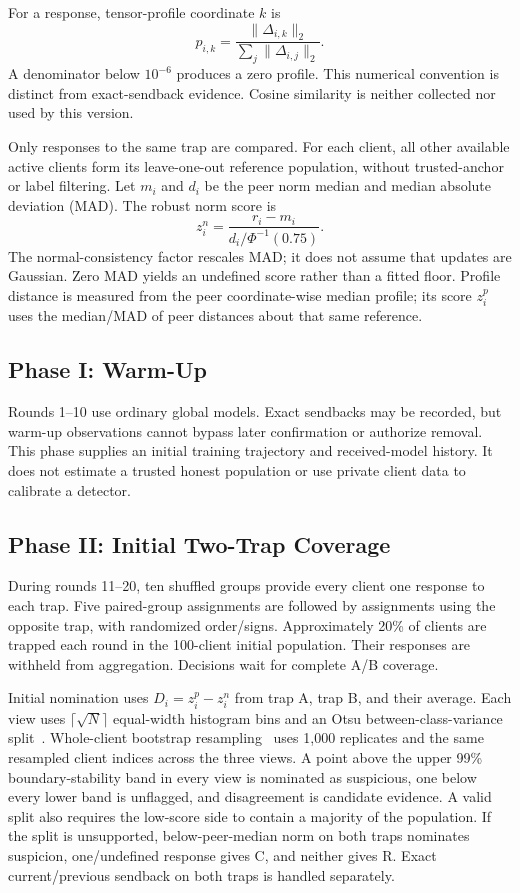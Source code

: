 \documentclass[conference]{IEEEtran}
\begin{document}
For a response, tensor-profile coordinate $k$ is
\begin{equation}
 p_{i,k}=\frac{\|\Delta_{i,k}\|_2}{\sum_j\|\Delta_{i,j}\|_2}.
\end{equation}
A denominator below $10^{-6}$ produces a zero profile. This numerical convention
is distinct from exact-sendback evidence. Cosine similarity is neither collected
nor used by this version.

Only responses to the same trap are compared. For each client, all other
available active clients form its leave-one-out reference population, without
trusted-anchor or label filtering. Let $m_i$ and $d_i$ be the peer norm median
and median absolute deviation (MAD). The robust norm score is
\begin{equation}
 z_i^n=\frac{r_i-m_i}{d_i/\Phi^{-1}(0.75)}.
\end{equation}
The normal-consistency factor rescales MAD; it does not assume that updates are
Gaussian. Zero MAD yields an undefined score rather than a fitted floor.
Profile distance is measured from the peer coordinate-wise median profile;
its score $z_i^p$ uses the median/MAD of peer distances about that same reference.

\subsection{Phase I: Warm-Up}
Rounds 1--10 use ordinary global models. Exact sendbacks may be recorded, but
warm-up observations cannot bypass later confirmation or authorize removal.
This phase supplies an initial training trajectory and received-model history.
It does not estimate a trusted honest population or use private client data to
calibrate a detector.

\subsection{Phase II: Initial Two-Trap Coverage}
During rounds 11--20, ten shuffled groups provide every client one response to
each trap. Five paired-group assignments are followed by assignments using the
opposite trap, with randomized order/signs. Approximately 20\% of clients are
trapped each round in the 100-client initial population. Their responses are
withheld from aggregation. Decisions wait for complete A/B coverage.

Initial nomination uses $D_i=z_i^p-z_i^n$ from trap A, trap B, and their average.
Each view uses $\lceil\sqrt N\rceil$ equal-width histogram bins and an Otsu
between-class-variance split~\cite{otsu1979threshold}. Whole-client bootstrap
resampling~\cite{efron1979bootstrap} uses 1,000
replicates and the same resampled client indices across the three views.
A point above the upper 99\% boundary-stability band in every view is nominated
as suspicious, one below every lower band is unflagged, and disagreement is
candidate evidence. A valid split also requires the low-score side to contain
a majority of the population. If the split is unsupported, below-peer-median
norm on both traps nominates suspicion, one/undefined response gives C, and
neither gives R. Exact current/previous sendback on both traps is handled separately.
\end{document}
